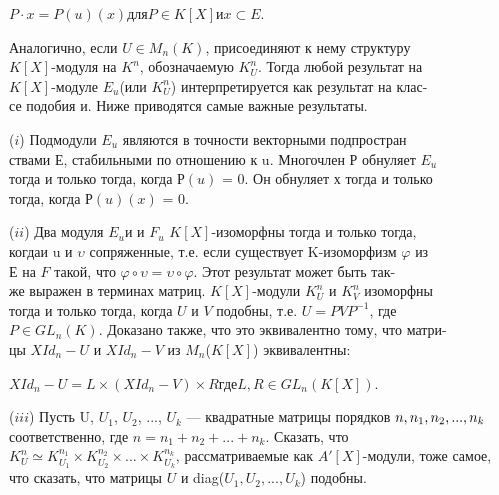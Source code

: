 \documentclass{../template/mai_book}
\begin{document}
\medskip

$P\cdot x = P(u)(x)$\;\;для\;\;$P\in K[X]$\;\;и\;\;$x\subset E$. 

\medskip

\noindent Аналогично, если $ U \in M_n(K)$, присоединяют к нему структуру\\ 
$K[X]$-модуля на $K^n$, обозначаемую $K_U^n$. Тогда любой результат на\\ 
$K[X]$-модуле $E_u$(или $K_U^n$) интерпретируется как результат на 
клас-\\се подобия и. Ниже приводятся самые важные результаты.

\medskip

($\mathit{i} $) Подмодули $E_u$ являются в точности векторными 
подпростран\\ствами Е, стабильными по отношению к u. Многочлен Р обнуляет $E_u$ \\тогда и только тогда, когда $Р(u)$ = 0. Он обнуляет х тогда и только\\ тогда, когда $Р(u)(x)$ = 0. 

\medskip

($\mathit{ii} $) Два модуля $E_u$и и $F_u$ $K[X]$-изоморфны тогда и только тогда,\\ когдаи u и $\upsilon$ сопряженные, т.е. если существует K-изоморфизм $\varphi$ из\\
$Е$ на $F$ такой, что $\varphi\circ\upsilon = \upsilon\circ\varphi$. Этот результат может быть 
так-\\же выражен в терминах матриц. $K[X]$-модули $K^n_U$ и $K^n_V$ изоморфны\\
тогда и только тогда, когда $U$ и $V$ подобны, т.е. $U = PVP^{-1}$, где\\ 
$P \in GL_n(K)$. Доказано также, что это эквивалентно тому, что 
матри-\\цы  $XId_n - U$ и $XId_n - V$ из $M_n$($K[X]$) эквивалентны:

\medskip

$XId_n - U = L\times (XId_n - V)\times R$\;\;где\;\;$L,R\in GL_n(K[X])$. 

\medskip

($\mathit{iii} $) Пусть U, $U_1$, $U_2$, ..., $U_k$ — квадратные матрицы порядков  
$n,\\n_1, n_2,..., n_k $ соответственно, где $n=n_1+n_2+...+ n_k $. Сказать, что\\
$ K^n_U\simeq K^{n_1}_{U_1}\times K^{n_2}_{U_2}\times...\times K^{n_k}_{U_k} $, рассматриваемые как $A'[X]$-модули, тоже 
самое, что сказать, что матрицы $U$ и diag($U_1, U_2,..., U_k$) подобны.
\end{document}
